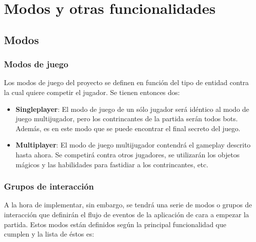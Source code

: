 \section{Modos y otras funcionalidades} %


\subsection{Modos}

\subsubsection{Modos de juego}
Los modos de juego del proyecto se definen en función del tipo de entidad contra la cual quiere competir el jugador. Se tienen entonces dos:

\begin{itemize}
    \item \textbf{Singleplayer}: El modo de juego de un sólo jugador será idéntico al modo de juego multijugador, pero los contrincantes de la partida serán todos bots. Además, es en este modo que se puede encontrar el final secreto del juego.
    \item \textbf{Multiplayer}: El modo de juego multijugador contendrá el gameplay descrito hasta ahora. Se competirá contra otros jugadores, se utilizarán los objetos mágicos y las habilidades para fastidiar a los contrincantes, etc.
\end{itemize}

\subsubsection{Grupos de interacción}

A la hora de implementar, sin embargo, se tendrá una serie de modos o grupos de interacción que definirán el flujo de eventos de la aplicación de cara a empezar la partida. Estos modos están definidos según la principal funcionalidad que cumplen y la lista de éstos es:

